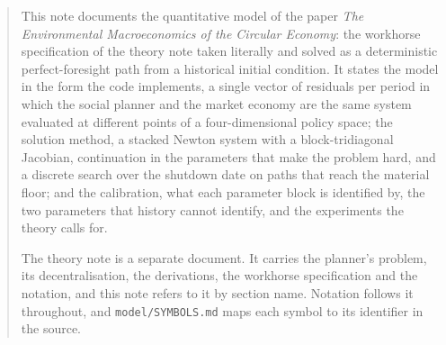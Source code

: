 \begin{abstract}
\noindent
This note documents the quantitative model of the paper \emph{The Environmental Macroeconomics of the Circular Economy}: the workhorse specification of the theory note taken literally and solved as a deterministic perfect-foresight path from a historical initial condition. It states the model in the form the code implements, a single vector of residuals per period in which the social planner and the market economy are the same system evaluated at different points of a four-dimensional policy space; the solution method, a stacked Newton system with a block-tridiagonal Jacobian, continuation in the parameters that make the problem hard, and a discrete search over the shutdown date on paths that reach the material floor; and the calibration, what each parameter block is identified by, the two parameters that history cannot identify, and the experiments the theory calls for.

The theory note is a separate document. It carries the planner's problem, its decentralisation, the derivations, the workhorse specification and the notation, and this note refers to it by section name. Notation follows it throughout, and \texttt{model/SYMBOLS.md} maps each symbol to its identifier in the source.
\end{abstract}
